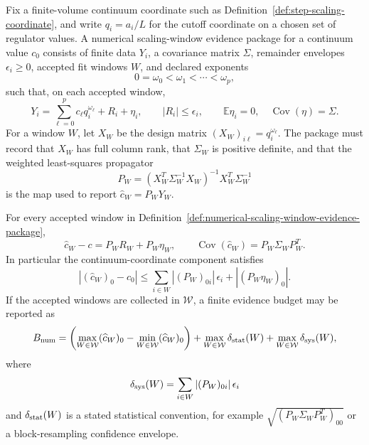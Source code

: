 \begin{definition}
\label{def:numerical-scaling-window-evidence-package}
Fix a finite-volume continuum coordinate such as
Definition~\ref{def:step-scaling-coordinate}, and write \(q_i=a_i/L\) for
the cutoff coordinate on a chosen set of regulator values.  A numerical
scaling-window evidence package for a continuum value \(c_0\) consists of
finite data \(Y_i\), a covariance matrix \(\Sigma\), remainder envelopes
\(\epsilon_i\ge0\), accepted fit windows \(W\), and declared exponents
\[
  0=\omega_0<\omega_1<\cdots<\omega_p ,
\]
such that, on each accepted window,
\begin{equation}
  Y_i
  =
  \sum_{\ell=0}^p c_\ell q_i^{\omega_\ell}
  +
  R_i+\eta_i,
  \qquad
  |R_i|\le\epsilon_i,
  \qquad
  \mathbb E\eta_i=0,\quad
  \operatorname{Cov}(\eta)=\Sigma .
  \label{eq:numerical-scaling-window-evidence-model}
\end{equation}
For a window \(W\), let \(X_W\) be the design matrix
\((X_W)_{i\ell}=q_i^{\omega_\ell}\).  The package must record that \(X_W\)
has full column rank, that \(\Sigma_W\) is positive definite, and that the
weighted least-squares propagator
\begin{equation}
  P_W
  =
  (X_W^T\Sigma_W^{-1}X_W)^{-1}X_W^T\Sigma_W^{-1}
  \label{eq:numerical-scaling-window-propagator}
\end{equation}
is the map used to report \(\widehat c_W=P_WY_W\).
\end{definition}

\begin{lemma}
\label{lem:finite-numerical-evidence-ledger}
For every accepted window in
Definition~\ref{def:numerical-scaling-window-evidence-package},
\begin{equation}
  \widehat c_W-c=P_WR_W+P_W\eta_W,
  \qquad
  \operatorname{Cov}(\widehat c_W)=P_W\Sigma_WP_W^T .
  \label{eq:finite-numerical-evidence-ledger}
\end{equation}
In particular the continuum-coordinate component satisfies
\begin{equation}
  |(\widehat c_W)_0-c_0|
  \le
  \sum_{i\in W}|(P_W)_{0i}|\,\epsilon_i
  +
  |(P_W\eta_W)_0| .
  \label{eq:finite-numerical-intercept-envelope}
\end{equation}
If the accepted windows are collected in \(\mathcal W\), a finite evidence
budget may be reported as
\begin{equation}
  B_{\rm num}
  =
  \left(
    \max_{W\in\mathcal W}(\widehat c_W)_0
    -
    \min_{W\in\mathcal W}(\widehat c_W)_0
  \right)
  +
  \max_{W\in\mathcal W}\delta_{\rm stat}(W)
  +
  \max_{W\in\mathcal W}\delta_{\rm sys}(W),
  \label{eq:numerical-scaling-window-evidence-budget}
\end{equation}
where
\[
  \delta_{\rm sys}(W)=\sum_{i\in W}|(P_W)_{0i}|\,\epsilon_i
\]
and \(\delta_{\rm stat}(W)\) is a stated statistical convention, for
example \(\sqrt{(P_W\Sigma_WP_W^T)_{00}}\) or a block-resampling confidence
envelope.
\end{lemma}

